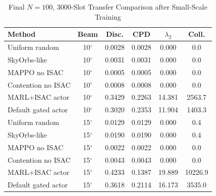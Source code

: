 \documentclass[journal]{IEEEtran}
\begin{document}
\begin{table}[!t]
  \centering
  \caption{Final $N=100$, 3000-Slot Transfer Comparison after Small-Scale Training}
  \label{tab:n100_transfer}
  \tiny
  \setlength{\tabcolsep}{3pt}
  \begin{tabular}{lccccc}
    \toprule
    Method & Beam & Disc. & CPD & $\lambda_2$ & Coll. \\
    \midrule
    Uniform random & 10$^\circ$ & 0.0028 & 0.0028 & 0.000 & 0.0 \\
    SkyOrbs-like & 10$^\circ$ & 0.0031 & 0.0031 & 0.000 & 0.0 \\
    MAPPO no ISAC & 10$^\circ$ & 0.0005 & 0.0005 & 0.000 & 0.0 \\
    Contention no ISAC & 10$^\circ$ & 0.0008 & 0.0008 & 0.000 & 0.0 \\
    MARL+ISAC actor & 10$^\circ$ & 0.3429 & 0.2263 & 14.381 & 2563.7 \\
    Default gated actor & 10$^\circ$ & 0.3020 & 0.2353 & 11.904 & 1403.3 \\
    \midrule
    Uniform random & 15$^\circ$ & 0.0129 & 0.0129 & 0.000 & 0.4 \\
    SkyOrbs-like & 15$^\circ$ & 0.0190 & 0.0190 & 0.000 & 0.4 \\
    MAPPO no ISAC & 15$^\circ$ & 0.0022 & 0.0022 & 0.000 & 0.0 \\
    Contention no ISAC & 15$^\circ$ & 0.0043 & 0.0043 & 0.000 & 0.0 \\
    MARL+ISAC actor & 15$^\circ$ & 0.4233 & 0.1387 & 19.889 & 10226.9 \\
    Default gated actor & 15$^\circ$ & 0.3618 & 0.2114 & 16.173 & 3535.0 \\
    \bottomrule
  \end{tabular}
\end{table}
\end{document}
